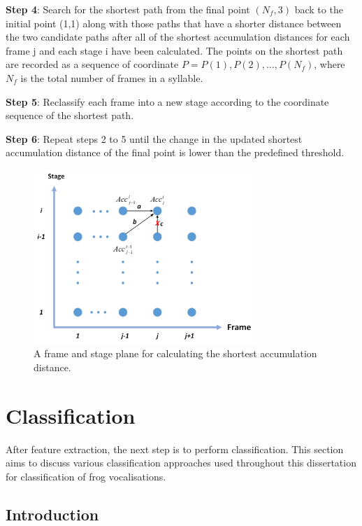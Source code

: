 \noindent  \textbf{Step 4}: Search for the shortest path from the final point $(N_{f},3)$ back to the initial point (1,1) along with those paths that have a shorter distance between the two candidate paths after all of the shortest accumulation distances for each frame j and each stage i have been calculated. The points on the shortest path are recorded as a sequence of coordinate $P={P(1),P(2),…,P(N_{f})}$, where $N_{f}$ is the total number of frames in a syllable. 

\noindent \textbf{Step 5}: Reclassify each frame into a new stage according to the coordinate sequence of the shortest path.

\noindent \textbf{Step 6}: Repeat steps 2 to 5 until the change in the updated shortest accumulation distance of the final point is lower than the predefined threshold. 


\begin{figure}[htb!]
\centering
\includegraphics[width=0.75\textwidth]{image/Method/MSAS.png}
\caption[MSAS process description]{A frame and stage plane for calculating the shortest accumulation distance.}
\label{fig:flowchart}
\end{figure}

\section{Classification}


After feature extraction, the next step is to perform classification. This section aims to discuss various classification approaches used throughout this dissertation for classification of frog vocalisations. 

\subsection{Introduction}


